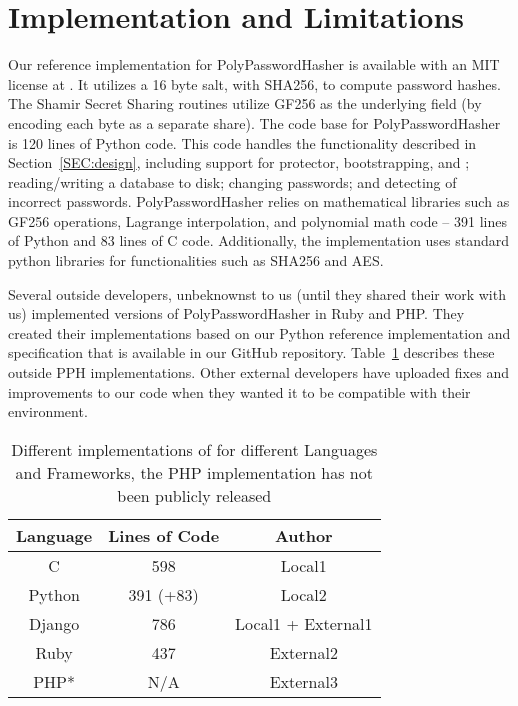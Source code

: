 \section{Implementation and Limitations}
\label{SEC:implementation}

Our reference implementation for PolyPasswordHasher is available with an MIT
license at \showurlx.  It utilizes a 16 byte salt, with SHA256, to compute password
hashes. The Shamir Secret Sharing routines utilize GF256 as the underlying
field (by encoding each byte as a separate share).  The code base for
PolyPasswordHasher is 120 lines of Python code.  This code handles the
functionality described in Section~\ref{SEC:design}, including support for protector,
bootstrapping, and \thresholdlessaccounts; reading/writing a database to disk;
changing passwords; and detecting \partialverification of incorrect passwords.
PolyPasswordHasher relies on mathematical libraries such as GF256 operations,
Lagrange interpolation, and polynomial math code -- 391 lines of Python and 83 lines
of C code.  Additionally, the implementation uses standard python
libraries for functionalities such as SHA256 and AES.

Several outside developers, unbeknownst to us (until they shared their work
with us) implemented versions of PolyPasswordHasher in Ruby and PHP.  They
created their implementations based on our Python reference implementation and
specification that is available in our GitHub repository.
Table~\ref{TABLE:source-code} describes these outside PPH implementations.
Other external developers have uploaded fixes and improvements to our code when
they wanted it to be compatible with their environment. 

\begin{table}[t]
    \centering
    \renewcommand{\arraystretch}{1.3}

    \begin{tabular}{| c | c | c | }
    \hline
    {\bf Language } & {\bf Lines of Code} & {\bf Author}\\
    \hline
    C & 598 & Local1\\
    \hline
    Python & 391 (+83) & Local2\\
    \hline
    Django & 786 & Local1 + External1\\
    \hline
    Ruby & 437 & External2\\
    \hline
    PHP* & N/A  & External3\\
    \hline
    \end{tabular}
    \caption{Different implementations of \PPH for different Languages and Frameworks, the
    PHP implementation has not been publicly released}
    \label{TABLE:source-code}
\end{table}



